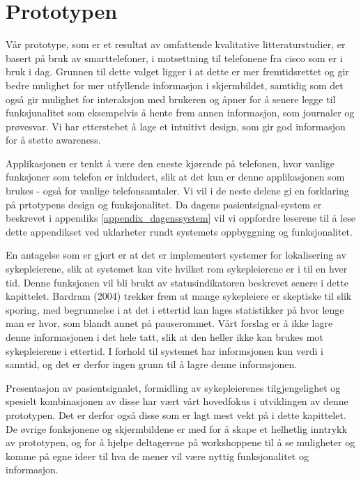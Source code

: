 \section{Prototypen}
\label{prototypen}

Vår prototype, som er et resultat av omfattende kvalitative litteraturstudier, er basert på bruk av smarttelefoner, i motsettning til telefonene fra cisco som er i bruk i dag. Grunnen til dette valget ligger i at dette er mer fremtidsrettet og gir bedre mulighet for mer utfyllende informasjon i skjermbildet, samtidig som det også gir mulighet for interaksjon med brukeren og åpner for å senere legge til funksjunalitet som eksempelvis å hente frem annen informasjon, som journaler og prøvesvar. Vi har etterstebet å lage et intuitivt design, som gir god informasjon for å støtte awareness.

\noindent
Applikasjonen er tenkt å være den eneste kjørende på telefonen, hvor vanlige funksjoner som telefon er inkludert, slik at det kun er denne applikasjonen som brukes - også for vanlige telefonsamtaler. Vi vil i de neste delene gi en forklaring på prtotypens design og funksjonalitet. Da dagens pasientsignal-system er beskrevet i appendiks \ref{appendix_dagenssystem} vil vi oppfordre leserene til å lese dette appendikset ved uklarheter rundt systemets oppbyggning og funksjonalitet.

\noindent
En antagelse som er gjort er at det er implementert systemer for lokalisering av sykepleierene, slik at systemet kan vite hvilket rom sykepleierene er i til en hver tid. Denne funksjonen vil bli brukt av statusindikatoren beskrevet senere i dette kapittelet. Bardram (2004) trekker frem at mange sykepleiere er skeptiske til slik sporing, med begrunnelse i at det i ettertid kan lages statistikker på hvor lenge man er hvor, som blandt annet på pauserommet. Vårt forslag er å ikke lagre denne informasjonen i det hele tatt, slik at den heller ikke kan brukes mot sykepleierene i ettertid. I forhold til systemet har informsjonen kun verdi i sanntid, og det er derfor ingen grunn til å lagre denne informsjonen.

\noindent
Presentasjon av pasientsignalet, formidling av sykepleierenes tilgjengelighet og spesielt kombinasjonen av disse har vært vårt hovedfokus i utviklingen av denne prototypen. Det er derfor også disse som er lagt mest vekt på i dette kapittelet. De øvrige fonksjonene og skjermbildene er med for å skape et helhetlig inntrykk av prototypen, og for å hjelpe deltagerene på workshoppene til å se muligheter og komme på egne ideer til hva de mener vil være nyttig funksjonalitet og informasjon.

